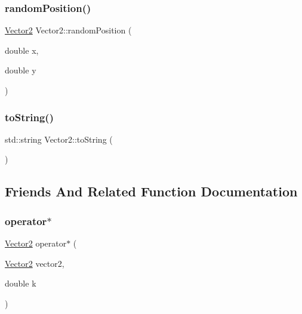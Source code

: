 \mbox{\label{struct_vector2_a13b12c4d8b92bbc3de6fca42cb7a2749}} 
\subsubsection{\texorpdfstring{random\+Position()}{randomPosition()}}
{\footnotesize\ttfamily \mbox{\hyperlink{struct_vector2}{Vector2}} Vector2\+::random\+Position (\begin{DoxyParamCaption}\item[{double}]{x,  }\item[{double}]{y }\end{DoxyParamCaption})\hspace{0.3cm}{\ttfamily [static]}}

\mbox{\label{struct_vector2_abcf7d729573613553822f965c3b9a3d2}} 
\subsubsection{\texorpdfstring{to\+String()}{toString()}}
{\footnotesize\ttfamily std\+::string Vector2\+::to\+String (\begin{DoxyParamCaption}{ }\end{DoxyParamCaption})}



\subsection{Friends And Related Function Documentation}
\mbox{\label{struct_vector2_a489f5283f5f1dc905c57d0a40d98c1af}} 
\subsubsection{\texorpdfstring{operator$\ast$}{operator*}\hspace{0.1cm}{\footnotesize\ttfamily [1/2]}}
{\footnotesize\ttfamily \mbox{\hyperlink{struct_vector2}{Vector2}} operator$\ast$ (\begin{DoxyParamCaption}\item[{\mbox{\hyperlink{struct_vector2}{Vector2}}}]{vector2,  }\item[{double}]{k }\end{DoxyParamCaption})\hspace{0.3cm}{\ttfamily [friend]}}



